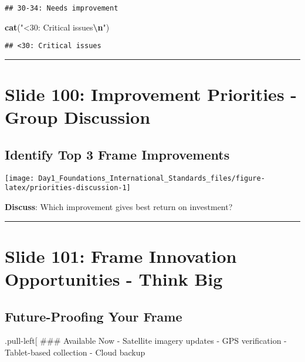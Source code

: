 \documentclass[
]{article}
\newenvironment{Shaded}{\begin{snugshade}}{\end{snugshade}}
\newcommand{\FunctionTok}[1]{\textcolor[rgb]{0.13,0.29,0.53}{\textbf{#1}}}
\newcommand{\NormalTok}[1]{#1}
\newcommand{\SpecialCharTok}[1]{\textcolor[rgb]{0.81,0.36,0.00}{\textbf{#1}}}
\newcommand{\StringTok}[1]{\textcolor[rgb]{0.31,0.60,0.02}{#1}}
\begin{document}
\begin{verbatim}
## 30-34: Needs improvement
\end{verbatim}

\begin{Shaded}
\begin{Highlighting}[]
\FunctionTok{cat}\NormalTok{(}\StringTok{"\textless{}30: Critical issues}\SpecialCharTok{\textbackslash{}n}\StringTok{"}\NormalTok{)}
\end{Highlighting}
\end{Shaded}

\begin{verbatim}
## <30: Critical issues
\end{verbatim}

\begin{center}\rule{0.5\linewidth}{0.5pt}\end{center}

\section{Slide 100: Improvement Priorities - Group
Discussion}\label{slide-100-improvement-priorities---group-discussion}

\subsection{Identify Top 3 Frame
Improvements}\label{identify-top-3-frame-improvements}

\texttt{[image: Day1\_Foundations\_International\_Standards\_files/figure-latex/priorities-discussion-1]}

\textbf{Discuss}: Which improvement gives best return on investment?

\begin{center}\rule{0.5\linewidth}{0.5pt}\end{center}

\section{Slide 101: Frame Innovation Opportunities - Think
Big}\label{slide-101-frame-innovation-opportunities---think-big}

\subsection{Future-Proofing Your
Frame}\label{future-proofing-your-frame}

.pull-left{[} \#\#\# Available Now - Satellite imagery updates - GPS
verification - Tablet-based collection - Cloud backup
\end{document}
